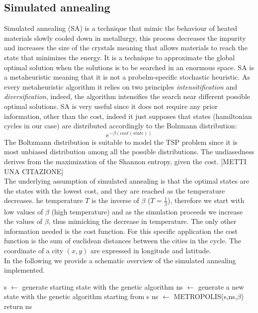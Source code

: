 \documentclass{article}
\begin{document}
\subsection{Simulated annealing}
Simulated annealing (SA) is a technique that mimic the behaviour of heated materials slowly cooled down in metallurgy, this process decreases the impurity and increases the size of the crystals meaning that allows materials to reach the state that minimizes the energy. It is a technique to approximate the global optimal solution when the solutions is to be searched in an enormous space. SA is a metaheuristic meaning that it is not a probelm-specific stochastic heuristic. As every metaheuristic algorithm it relies on two principles \textit{intensitification} and \textit{diversification}, indeed, the algorithm intensifies the search near different possible optimal solutions.
SA is very useful since it does not require any prior information, other than the cost, indeed it just supposes that states (hamiltonian cycles in our case) are distributed accordingly to the Bolzmann distribution:
\begin{equation}
e^{- \beta (cost(state))}
\end{equation}
The Boltzmann distribution is suitable to model the TSP problem since it is most unbiased distribution among all the possible distributions. The undiasedness derives from the maximization of the Shannon entropy, given the cost. [METTI UNA CITAZIONE]\\
The underlying assumption of simulated annealing is that the optimal states are the states with the lowest cost, and they are reached as the temperature decreases.
he temperature $T$ is the inverse of $\beta$ ($T = \frac{1}{\beta}$), therefore we start with low values of $\beta$ (high temperature) and as the simulation proceeds we increase the values of $\beta$, thus mimicking the decrease in temperature.
The only other information needed is the cost function. For this specific application the cost function is the sum of euclidean distances between the cities in the cycle. The coordinate of a city $(x,y)$ are expressed in longitude and latitude.\\
In the following we provide a schematic overview of the simulated annealing implemented.

\begin{algorithm}[H]
    \begin{algorithmic}[1]
        \State s $\leftarrow$ generate starting state with the genetic algorithm
         	 \State ns $\leftarrow$ generate a new state with the genetic algorithm starting from s
         	\State ns $\leftarrow$ METROPOLIS(s,ns,$\beta$)
         	\EndFor
        \EndFor
        \State return ns
       \EndFunction
\end{algorithmic}
\end{algorithm}
\end{document}
